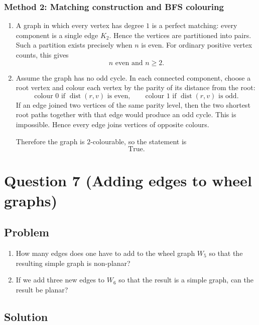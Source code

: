 \documentclass[12pt]{article}
\DeclareMathOperator{\dist}{dist}
\begin{document}
\subsubsection{Method 2: Matching construction and BFS colouring}
\begin{enumerate}[label=(\alph*)]
  \item A graph in which every vertex has degree $1$ is a perfect matching: every component is a single edge $K_2$. Hence the vertices are partitioned into pairs. Such a partition exists precisely when $n$ is even. For ordinary positive vertex counts, this gives
  \[
    \boxed{n\text{ even and }n\ge 2.}
  \]

  \item Assume the graph has no odd cycle. In each connected component, choose a root vertex and colour each vertex by the parity of its distance from the root:
  \[
    \text{colour }0\text{ if }\dist(r,v)\text{ is even},
    \qquad
    \text{colour }1\text{ if }\dist(r,v)\text{ is odd}.
  \]
  If an edge joined two vertices of the same parity level, then the two shortest root paths together with that edge would produce an odd cycle. This is impossible. Hence every edge joins vertices of opposite colours.

  Therefore the graph is $2$-colourable, so the statement is
  \[
    \boxed{\text{True}.}
  \]
\end{enumerate}

\newpage
\section{Question 7 (Adding edges to wheel graphs)}

\subsection{Problem}
\begin{enumerate}[label=(\alph*)]
  \item How many edges does one have to add to the wheel graph $W_5$ so that the resulting simple graph is non-planar?
  \item If we add three new edges to $W_6$ so that the result is a simple graph, can the result be planar?
\end{enumerate}

\subsection{Solution}
\end{document}
